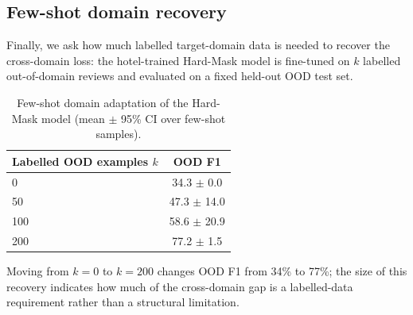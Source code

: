 \documentclass[11pt]{article}
\begin{document}
\subsection{Few-shot domain recovery}\label{sec:fewshot}
Finally, we ask how much labelled target-domain data is needed to recover the cross-domain loss: the hotel-trained Hard-Mask model is fine-tuned on $k$ labelled out-of-domain reviews and evaluated on a fixed held-out OOD test set.
\begin{table}[H]\centering
\caption{Few-shot domain adaptation of the Hard-Mask model (mean $\pm$ 95\% CI over few-shot samples).}
\label{tab:fewshot}
\small
\begin{tabular}{lc}
\toprule
Labelled OOD examples $k$ & OOD F1 \\
\midrule
0 & 34.3 $\pm$ 0.0 \\
50 & 47.3 $\pm$ 14.0 \\
100 & 58.6 $\pm$ 20.9 \\
200 & 77.2 $\pm$ 1.5 \\
\bottomrule
\end{tabular}
\end{table}
Moving from $k=0$ to $k=200$ changes OOD F1 from 34\% to 77\%; the size of this recovery indicates how much of the cross-domain gap is a labelled-data requirement rather than a structural limitation.
\end{document}
